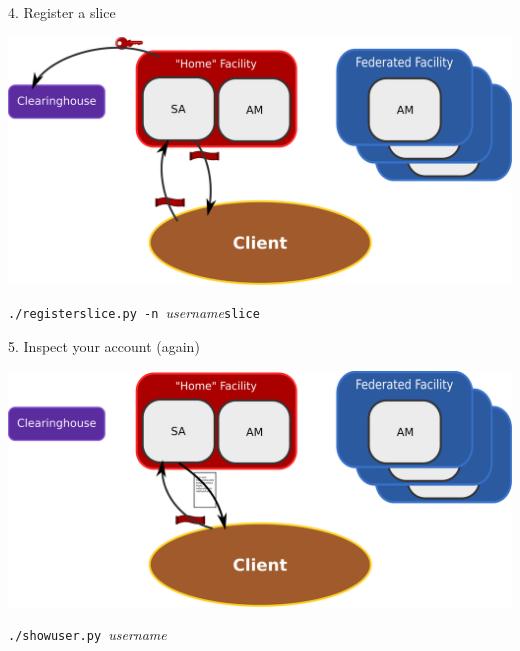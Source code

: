 \documentclass[landscape]{slides}
\newcommand{\heading}[1]{{\fontseries{b}\selectfont\begin{center}{\LARGE\color{red} #1}\end{center}}}
\begin{document}
\begin{slide}
\heading{4. Register a slice}
\begin{center}
\includegraphics[width=15cm]{tutorial-diagram-2}
\end{center}
\begin{center}{\tt ./registerslice.py -n }\emph{username}{\tt slice}\end{center}
\end{slide}

\begin{slide}
\heading{5. Inspect your account (again)}
\begin{center}
\includegraphics[width=15cm]{tutorial-diagram-7}
\end{center}
\begin{center}{\tt ./showuser.py }\emph{username}\end{center}
\end{slide}
\end{document}
